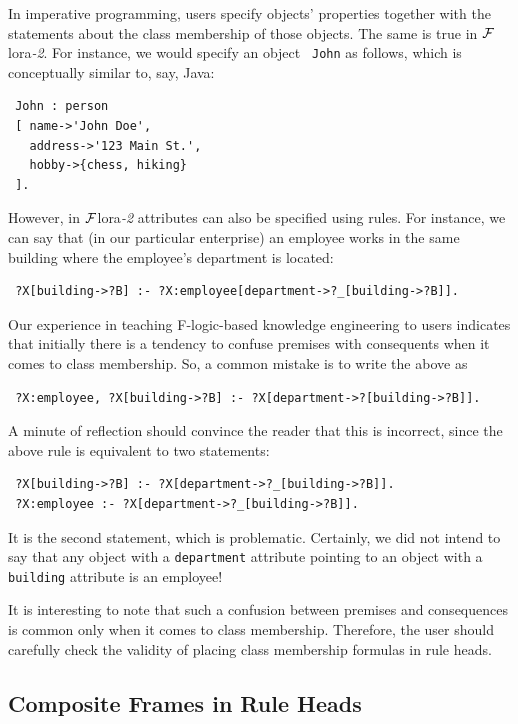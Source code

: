 \documentclass[11pt]{article}
\newcommand{\FLORA}{{\mbox{\sc ${\cal F}${lora}\rm\emph{-2}}}\xspace}
\newcommand{\FLSYSTEM}{\FLORA}
\begin{document}
In imperative programming, users specify objects' properties together with
the statements about the class membership of those objects.
The same is true in \FLSYSTEM. For instance, we would specify an object {\tt
  John} as follows, which is conceptually similar to, say, Java:
\begin{verbatim}
 John : person
 [ name->'John Doe',
   address->'123 Main St.',
   hobby->{chess, hiking}
 ].
\end{verbatim}
However, in \FLSYSTEM attributes can also be specified using rules. For
instance, we can say that (in our particular enterprise)
an employee works in the same building where the employee's department is
located:
\begin{verbatim}
 ?X[building->?B] :- ?X:employee[department->?_[building->?B]].  
\end{verbatim}
Our experience in teaching F-logic-based knowledge engineering
to users indicates that
initially there is a tendency to confuse premises with consequents when it
comes to class membership. So, a common mistake is to write the above as
\begin{verbatim}
 ?X:employee, ?X[building->?B] :- ?X[department->?[building->?B]].  
\end{verbatim}
A minute of reflection should convince the reader that this is incorrect, since
the above rule is equivalent to two statements:
\begin{verbatim}
 ?X[building->?B] :- ?X[department->?_[building->?B]].  
 ?X:employee :- ?X[department->?_[building->?B]].
\end{verbatim}
It is the second statement, which is problematic. Certainly, we did not
intend to say that any object with a {\tt department} attribute pointing to
an object with a {\tt building} attribute is an employee!

It is interesting to note that such a confusion between premises and
consequences is common only when it comes to class membership. Therefore,
the user should carefully check the validity of placing class membership
formulas in rule heads.

\subsection{Composite Frames in Rule Heads}
\end{document}

